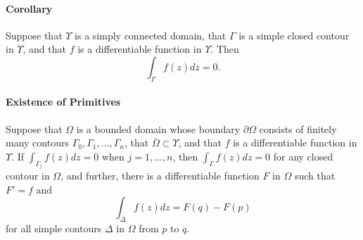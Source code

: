 \paragraph{Corollary}
Suppose that \(\Upsilon\) is a simply connected domain, that \(\Gamma\) is a simple closed contour in \(\Upsilon\), and that \(f\) is a differentiable function in \(\Upsilon\). Then
\[\int_\Gamma f(z) dz = 0.\]

\paragraph{Existence of Primitives}
Suppose that \(\Omega\) is a bounded domain whose boundary \(\partial\Omega\) consists of finitely many contours \(\Gamma_0, \Gamma_1, \dots, \Gamma_n\), that \(\bar{\Omega} \subset \Upsilon\), and that \(f\) is a differentiable function in \(\Upsilon\). If \(\int_{\Gamma_j} f(z) dz = 0\) when \(j = 1, \dots, n\), then \(\int_\Gamma f(z) dz = 0\) for any closed contour in \(\Omega\), and further, there is a differentiable function \(F\) in \(\Omega\) such that \(F' = f\) and
\[\int_\Delta f(z) dz = F(q) - F(p)\]
for all simple contours \(\Delta\) in \(\Omega\) from \(p\) to \(q\).